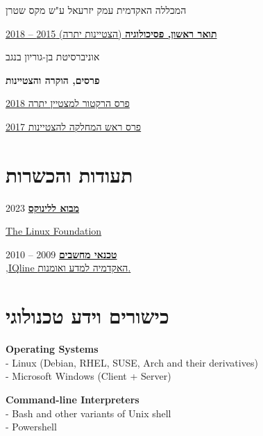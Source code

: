 \documentclass[
	12pt,a4paper %
]{article}
\begin{document}
\begin{hebrew}
	\noindent המכללה האקדמית עמק יזרעאל ע"ש מקס שטרן

	\noindent\dotfill %

	\noindent\href{https://loona-il.000webhostapp.com/resume-references/BA-and-honorary.pdf}{\large \noindent\textbf{תואר ראשון, פסיכולוגיה} \normalsize{(הצטיינות יתרה)} \hfill 2015 -- 2018}

	\noindent אוניברסיטת בן-גוריון בנגב

	\noindent\textbf{פרסים, הוקרה והצטיינות}

	\href{https://loona-il.000webhostapp.com/resume-references/BA-and-honorary.pdf}{פרס הרקטור למצטיין יתרה \hfill 2018}

	\href{https://loona-il.000webhostapp.com/resume-references/BA-and-honorary.pdf}{פרס ראש המחלקה להצטיינות \hfill 2017}

	\begin{paracol}{2} %
		\section{תעודות והכשרות}

\href{https://courses.edx.org/certificates/dc4f0cd758304785a2ea62cca29e6a86}{\textbf{מבוא ללינוקס}} \hfill 2023 \\
\begin{english}
\href{https://courses.edx.org/certificates/dc4f0cd758304785a2ea62cca29e6a86}{The Linux Foundation} \end{english}

		\href{https://loona-il.000webhostapp.com/resume-references/computer-technitian-certificate.jpg}{\textbf{טכנאי מחשבים}} \hfill 2009 -- 2010 \\
		\href{https://loona-il.000webhostapp.com/resume-references/computer-technitian-certificate.jpg}{,IQline האקדמיה למדע ואומנות.}

		\section{כישורים וידע טכנולוגי}

		\unsetRTL
		\setLTR

\textbf{Operating Systems} \\
- Linux (Debian, RHEL, SUSE, Arch and their derivatives)\\
- Microsoft Windows (Client + Server)

\textbf{Command-line Interpreters} \\
- Bash and other variants of Unix shell \\
- Powershell


\end{paracol}
\end{hebrew}
\end{document}
